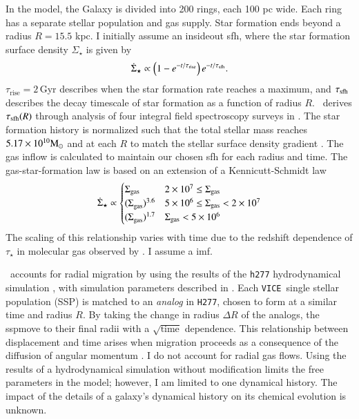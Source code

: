 \documentclass[12pt,oneside,letterpaper]{report}
\newcommand{\sfh}{\gls{sfh}}
\newcommand{\ssp}{\gls{ssp}}
\newcommand{\imf}{\gls{imf}}
\newcommand{\JJ}{\citetalias{james+21}}
\newcommand{\VICE}{\texttt{VICE}}
\begin{document}
In the model, the Galaxy is divided into 200 rings, each 100 pc wide. Each ring has a separate stellar population and gas supply. Star formation ends beyond a radius $R=15.5$ kpc. I initially assume an \gls{insideout} \sfh{}, where the star formation surface density $\Sigma_\star$ is given by 
\begin{equation}\label{eq:inside_out}
    \dot{\Sigma}_\star \propto \left(1-e^{-t/\tau_{\rm rise}}\right) e^{-t/\tau_{\rm sfh}}.
\end{equation}
$\tau_\text{rise}=2$\,Gyr describes when the star formation rate reaches a maximum, and $\tau_{\rm sfh}$ describes the decay timescale of star formation as a function of radius $R$. \JJ~derives $\tau_{\rm sfh}(R)$ through analysis of four integral field spectroscopy surveys in \cite{sanches20}. The star formation history is normalized such that the total stellar mass reaches $5.17\times10^{10} {\rm M}_\odot$ \citep{LM15} and at each $R$ to match the stellar surface density gradient \citep{BHG16}.
The gas inflow is calculated to maintain our chosen \sfh{} for each radius and time. The gas-star-formation law is based on an extension of a Kennicutt-Schmidt law \citep{kennicutt98}
\begin{equation}
\dot{\Sigma}_{\star} \propto 
\begin{cases}
    {\Sigma}_{\rm gas} & 2\times 10^7 \leq \Sigma_{\rm gas} \\ 
    {(\Sigma}_{\rm gas})^{3.6} & 5\times 10^6 \leq \Sigma_{\rm gas} < 2\times10^7 \\ 
    {(\Sigma}_{\rm gas})^{1.7} & \Sigma_{\rm gas} < 5\times10^6 \\ 
\end{cases}
\end{equation}
The scaling of this relationship varies with time due to the redshift dependence of $\tau_\star$ in molecular gas observed by \citet{tacconi18}. I assume a \citet{kroupa01} \imf.


\JJ\ accounts for radial migration by using the results of the \texttt{h277} hydrodynamical simulation \citep{christensen12, zolotov12, loebman12, BZ14}, with simulation parameters described in \citet{bird+21}. Each \VICE\ single stellar population (SSP) is matched to an \textit{analog} in \texttt{H277}, chosen to form at a similar time and radius $R$. By taking the change in radius $\Delta R$ of the analogs, the \ssp move to their final radii with a $\sqrt{\text{time}}$ dependence.
This relationship between displacement and time arises when migration proceeds as a consequence of the diffusion of angular momentum \citep{frankel18, frankel20}.
I do not account for radial gas flows.
Using the results of a hydrodynamical simulation without modification limits the free parameters in the model; however, I am limited to one dynamical history. The impact of the details of a galaxy's dynamical history on its chemical evolution is unknown.
\end{document}
